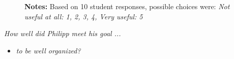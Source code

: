 \begin{boenumerate}
\begin{figure}[h!]\centering
{}\hspace{0.5cm}
\begin{center}
\begin{minipage}[t]{0.85\columnwidth}\vspace{-0.75cm}
\item\scriptsize{\textbf{Notes:} Based on 10 student responses, possible choices were: \emph{Not useful at all: 1, 2, 3, 4, Very useful: 5}}
\end{minipage}
\end{center}
\end{figure}
\FloatBarrier
\item \textit{How well did Philipp meet his goal ...}
\begin{itemize}
\item \textit{to be well organized?}


\end{itemize}
\end{boenumerate}

